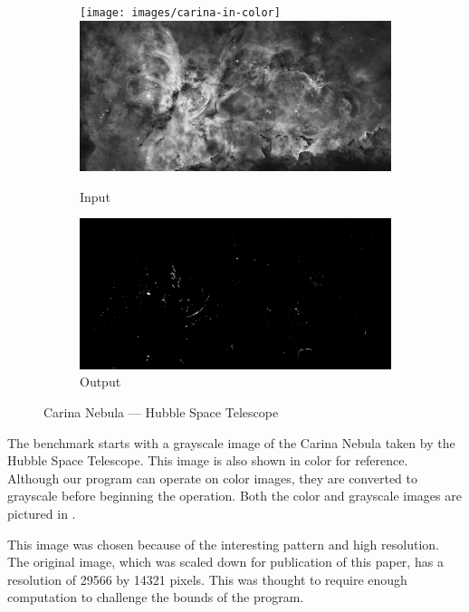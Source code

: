 \documentclass[
abstracton,
fontsize=12pt,
]{scrartcl}
\begin{document}
\begin{figure}[p]
  \centering
  \begin{subfigure}{0.8\textwidth}
    \texttt{[image: images/carina-in-color]}
    \includegraphics[width=\textwidth]{images/carina-in-grayscale}
    \caption{Input}\label{fig:carina-in}
  \end{subfigure}
  \begin{subfigure}{0.8\textwidth}
    \includegraphics[width=\textwidth]{images/carina-out}
    \caption{Output}\label{fig:carina-out}
  \end{subfigure}
  \caption{Carina Nebula --- Hubble Space Telescope}\label{fig:carina}
\end{figure}

The benchmark starts with a grayscale image of the Carina Nebula taken by the Hubble Space Telescope. This image is also shown in color for reference. Although our program can operate on color images, they are converted to grayscale before beginning the operation. Both the color and grayscale images are pictured in .

This image was chosen because of the interesting pattern and high resolution. The original image, which was scaled down for publication of this paper, has a resolution of 29566 by 14321 pixels. This was thought to require enough computation to challenge the bounds of the program.
\end{document}
